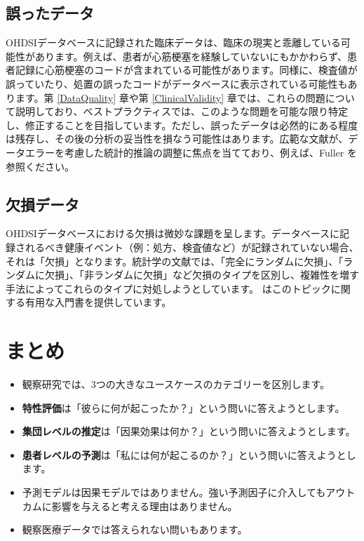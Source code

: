 \documentclass[
  11pt]{book}
\makeatletter
\newenvironment{kframe}{%
\medskip{}
\setlength{\fboxsep}{.8em}
 \def\at@end@of@kframe{}%
 \ifinner\ifhmode%
  \def\at@end@of@kframe{\end{minipage}}%
  \begin{minipage}{\columnwidth}%
 \fi\fi%
 \def\FrameCommand##1{\hskip\@totalleftmargin \hskip-\fboxsep
 \colorbox{myShadeColor}{##1}\hskip-\fboxsep
     \hskip-\linewidth \hskip-\@totalleftmargin \hskip\columnwidth}%
 \MakeFramed {\advance\hsize-\width
   \@totalleftmargin\z@ \linewidth\hsize
   \@setminipage}}%
 {\par\unskip\endMakeFramed%
 \at@end@of@kframe}
\newenvironment{rmdblock}[1]
  {
  \begin{itemize}
  \renewcommand{\labelitemi}{
    \raisebox{-.7\height}[0pt][0pt]{
      {\setkeys{Gin}{width=3em,keepaspectratio}\texttt{[image: images/\#1]}}
    }
  }
  \setlength{\fboxsep}{1em}
  \begin{kframe}
  \item
  }
  {
  \end{kframe}
  \end{itemize}
  }
\newenvironment{rmdsummary}
  {\begin{rmdblock}{summary}}
  {\end{rmdblock}}
\theoremstyle{definition}
\theoremstyle{definition}
\theoremstyle{definition}
\theoremstyle{definition}
\theoremstyle{remark}
\makeatother
\begin{document}
\subsection{誤ったデータ}\label{ux8aa4ux3063ux305fux30c7ux30fcux30bf}

OHDSIデータベースに記録された臨床データは、臨床の現実と乖離している可能性があります。例えば、患者が心筋梗塞を経験していないにもかかわらず、患者記録に心筋梗塞のコードが含まれている可能性があります。同様に、検査値が誤っていたり、処置の誤ったコードがデータベースに表示されている可能性もあります。第 \ref{DataQuality} 章や第 \ref{ClinicalValidity} 章では、これらの問題について説明しており、ベストプラクティスでは、このような問題を可能な限り特定し、修正することを目指しています。ただし、誤ったデータは必然的にある程度は残存し、その後の分析の妥当性を損なう可能性はあります。広範な文献が、データエラーを考慮した統計的推論の調整に焦点を当てており、例えば、Fuller \citet{fuller2009measurement} を参照ください。

\subsection{欠損データ}\label{ux6b20ux640dux30c7ux30fcux30bf}


OHDSIデータベースにおける欠損は微妙な課題を呈します。データベースに記録されるべき健康イベント（例：処方、検査値など）が記録されていない場合、それは「欠損」となります。統計学の文献では、「完全にランダムに欠損」、「ランダムに欠損」、「非ランダムに欠損」など欠損のタイプを区別し、複雑性を増す手法によってこれらのタイプに対処しようとしています。\citet{perkins2017principled} はこのトピックに関する有用な入門書を提供しています。

\section{まとめ}\label{ux307eux3068ux3081-5}

\begin{rmdsummary}
\begin{itemize}
\item
  観察研究では、3つの大きなユースケースのカテゴリーを区別します。
\item
  \textbf{特性評価}は「彼らに何が起こったか？」という問いに答えようとします。
\item
  \textbf{集団レベルの推定}は「因果効果は何か？」という問いに答えようとします。
\item
  \textbf{患者レベルの予測}は「私には何が起こるのか？」という問いに答えようとします。
\item
  予測モデルは因果モデルではありません。強い予測因子に介入してもアウトカムに影響を与えると考える理由はありません。
\item
  観察医療データでは答えられない問いもあります。
\end{itemize}
\end{rmdsummary}
\end{document}
